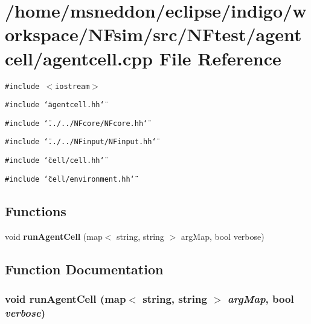 \section{/home/msneddon/eclipse/indigo/workspace/NFsim/src/NFtest/agentcell/agentcell.cpp File Reference}
\label{agentcell_8cpp}


{\tt \#include $<$iostream$>$}\par
{\tt \#include \char`\"{}agentcell.hh\char`\"{}}\par
{\tt \#include \char`\"{}../../NFcore/NFcore.hh\char`\"{}}\par
{\tt \#include \char`\"{}../../NFinput/NFinput.hh\char`\"{}}\par
{\tt \#include \char`\"{}cell/cell.hh\char`\"{}}\par
{\tt \#include \char`\"{}cell/environment.hh\char`\"{}}\par
\subsection*{Functions}
\begin{CompactItemize}
\item 
void {\bf runAgentCell} (map$<$ string, string $>$ argMap, bool verbose)
\end{CompactItemize}


\subsection{Function Documentation}
\subsubsection{\setlength{\rightskip}{0pt plus 5cm}void runAgentCell (map$<$ string, string $>$ {\em argMap}, bool {\em verbose})}\label{agentcell_8cpp_b3bca48acc52c98af56e755d0d017b31}


